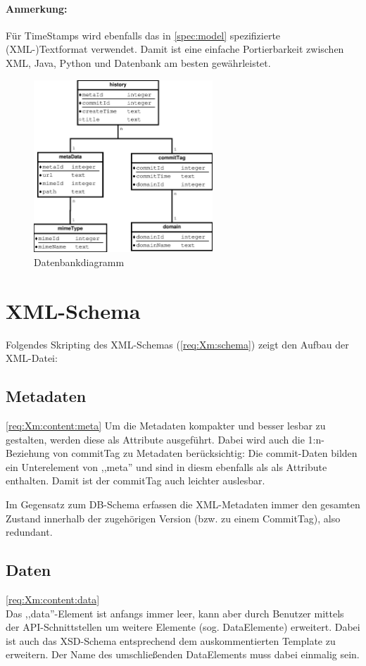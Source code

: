 \paragraph{Anmerkung:} Für TimeStamps wird ebenfalls das in \ref{spec:model} spezifizierte (XML-)Textformat
verwendet. Damit ist eine einfache Portierbarkeit zwischen XML, Java, Python und Datenbank am besten gewährleistet.

\begin{figure}[h]
	\centering
	\label{dia:design:frontend:data:db}
	\includegraphics[width=0.6\textwidth]{design/data/db.eps}
	\caption{Datenbankdiagramm}
\end{figure}

\section{XML-Schema}
Folgendes Skripting des XML-Schemas (\ref{req:Xm:schema}) zeigt den Aufbau der XML-Datei:

\subsection{Metadaten}
\ref{req:Xm:content:meta}
Um die Metadaten kompakter und besser lesbar zu gestalten, 
werden diese als Attribute ausgeführt. 
Dabei wird auch die 1:n-Beziehung von commitTag zu Metadaten berücksichtig:
Die commit-Daten bilden ein Unterelement von ,,meta'' und sind in diesm ebenfalls als
als Attribute enthalten.
Damit ist der commitTag auch leichter auslesbar.


Im Gegensatz zum DB-Schema erfassen die XML-Metadaten immer den gesamten Zustand innerhalb der zugehörigen Version (bzw. zu einem CommitTag), also redundant. 
\subsection{Daten}
\ref{req:Xm:content:data} \\
Das ,,data''-Element ist anfangs immer leer, kann aber durch Benutzer mittels der API-Schnittstellen 
um weitere Elemente (sog. DataElemente) erweitert.
Dabei ist auch das XSD-Schema entsprechend dem auskommentierten Template zu erweitern.
Der Name des umschließenden DataElements muss dabei einmalig sein.

